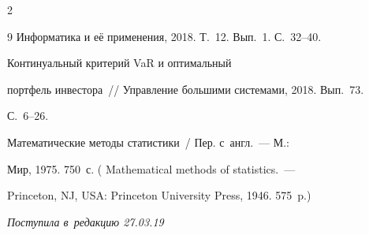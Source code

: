 \begin{multicols}{2}
{{\begin{thebibliography}{9}
Информатика и её применения, 2018. Т.~12. Вып.~1. С.~32--40. 




   Континуальный критерий VaR и оптимальный 


портфель инвестора~// Управление большими системами, 2018. Вып.~73.  


С.~6--26.




   Математические методы статистики~/ Пер. с~англ.~--- М.: 


Мир, 1975. 750~с. ( Mathematical methods of statistics.~--- 


Princeton, NJ, USA: Princeton University Press, 1946. 575~p.)


 \end{thebibliography}





 }


 }





\end{multicols}





\vspace*{-7pt}





\hfill{\small\textit{Поступила в~редакцию 27.03.19}}















\newpage





\vspace*{-28pt}















